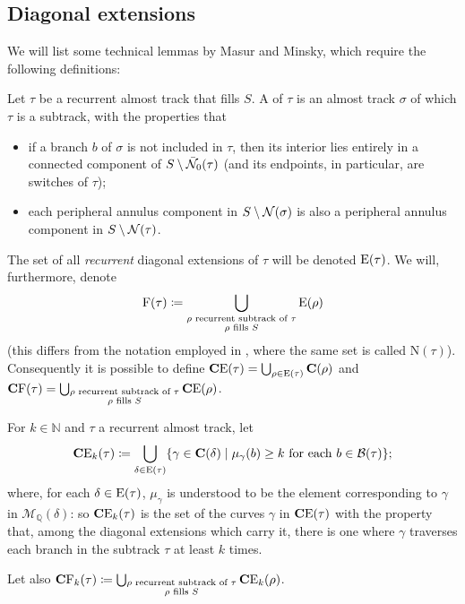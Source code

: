 \subsection{Diagonal extensions}
\label{sub:diagext}
We will list some technical lemmas by Masur and Minsky, which require the following definitions:
\begin{defin}\label{def:diagext}
Let $\tau$ be a recurrent almost track that fills $S$. A  of $\tau$ is an almost track $\sigma$ of which $\tau$ is a subtrack, with the properties that
\begin{itemize}
\item if a branch $b$ of $\sigma$ is not included in $\tau$, then its interior lies entirely in a connected component of $S\setminus \bar{{\mathcal N}}_0(\tau)$ (and its endpoints, in particular, are switches of $\tau$);
\item each peripheral annulus component in $S\setminus{\mathcal N}(\sigma)$ is also a peripheral annulus component in $S\setminus{\mathcal N}(\tau)$.
\end{itemize}

The set of all \emph{recurrent} diagonal extensions of $\tau$ will be denoted $\mathrm{E}(\tau)$. We will, furthermore, denote
$$\mathrm{F}(\tau)\coloneqq\bigcup_{\substack{\rho\text{ recurrent subtrack of }\tau\\ \rho\text{ fills }S}}\mathrm{E}(\rho)$$
(this differs from the notation employed in \cite{masurminskyi}, \cite{masurminskyq} where the same set is called $\mathrm{N}(\tau)$). Consequently it is possible to define $\mathbf C \mathrm E(\tau)=\bigcup_{\rho\in \mathrm{E}(\tau)} \mathbf C(\rho)$ and $\mathbf C \mathrm F(\tau)=\bigcup_{\substack{\rho\text{ recurrent subtrack of }\tau\\ \rho\text{ fills }S}}\mathbf C \mathrm E(\rho)$.

For $k\in\mathbb N$ and $\tau$ a recurrent almost track, let 
$$\mathbf C \mathrm E_k(\tau)\coloneqq \bigcup_{\delta\in \mathrm{E}(\tau)} \{\gamma\in \mathbf C(\delta)\mid \mu_\gamma(b)\geq k\text{ for each } b\in\mathcal B(\tau)\};$$
where, for each $\delta\in \mathrm{E}(\tau)$, $\mu_\gamma$ is understood to be the element corresponding to $\gamma$ in ${\mathcal M}_{\mathbb Q}(\delta)$: so $\mathbf C \mathrm E_k(\tau)$ is the set of the curves $\gamma$ in $\mathbf C \mathrm E(\tau)$ with the property that, among the diagonal extensions which carry it, there is one where $\gamma$ traverses each branch in the subtrack $\tau$ at least $k$ times.

Let also $\mathbf C \mathrm F_k(\tau)\coloneqq \bigcup_{\substack{\rho\text{ recurrent subtrack of }\tau\\ \rho\text{ fills }S}} \mathbf C \mathrm E_k(\rho)$.
\end{defin}


